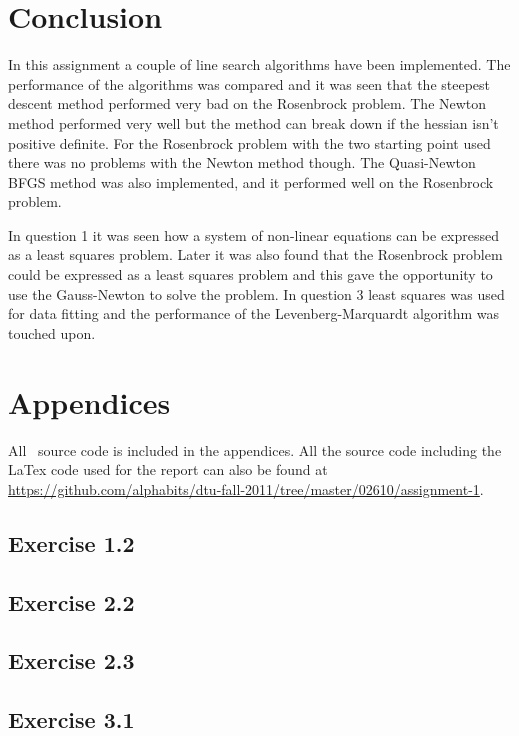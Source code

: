 \section*{Conclusion}
In this assignment a couple of line search algorithms have been implemented. The performance of the algorithms was compared and it was seen that the steepest descent method performed very bad on the Rosenbrock problem. The Newton method performed very well but the method can break down if the hessian isn't positive definite. For the Rosenbrock problem with the two starting point used there was no problems with the Newton method though. The Quasi-Newton BFGS method was also implemented, and it performed well on the Rosenbrock problem. \par
In question 1 it was seen how a system of non-linear equations can be expressed as a least squares problem. Later it was also found that the Rosenbrock problem could be expressed as a least squares problem and this gave the opportunity to use the Gauss-Newton to solve the problem. In question 3 least squares was used for data fitting and the performance of the Levenberg-Marquardt algorithm was touched upon.

\pagebreak
\renewcommand\thesection{\Alph{section}}
\section{Appendices}
All \matlab\ source code is included in the appendices. All the source code including the LaTex code used for the report can also be found at \url{https://github.com/alphabits/dtu-fall-2011/tree/master/02610/assignment-1}.
\subsection{Exercise 1.2}\label{app:ex-1.2}

\subsection{Exercise 2.2}\label{app:ex-2.2}

\subsection{Exercise 2.3}\label{app:ex-2.3}

\subsection{Exercise 3.1}\label{app:ex-3.1}

